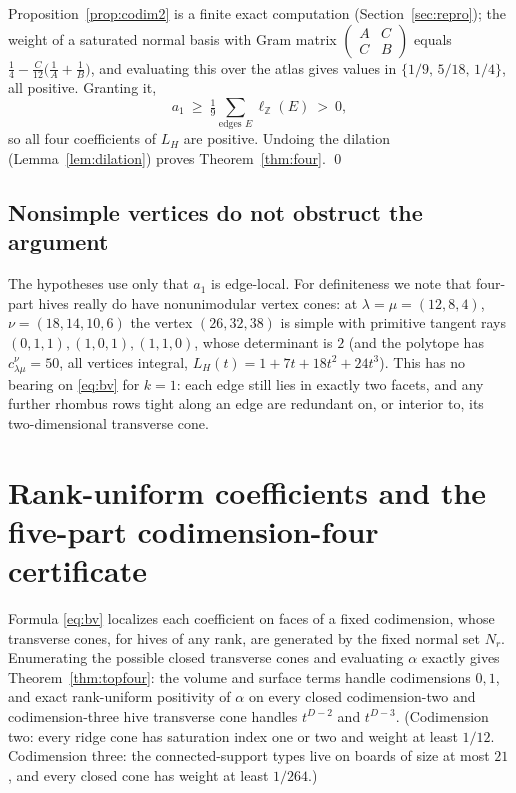 \documentclass[11pt]{amsart}
\theoremstyle{definition}
\newcommand{\Z}{\mathbb{Z}}
\newcommand{\lam}{\lambda}
\begin{document}
Proposition~\ref{prop:codim2} is a finite exact computation
(Section~\ref{sec:repro}); the weight of a saturated normal basis with Gram
matrix $\left(\begin{smallmatrix}A&C\\ C&B\end{smallmatrix}\right)$ equals
$\tfrac14-\tfrac{C}{12}\bigl(\tfrac1A+\tfrac1B\bigr)$, and evaluating this over
the atlas gives values in $\{1/9,\,5/18,\,1/4\}$, all positive. Granting it,
\[
  a_1\ \ge\ \tfrac19\sum_{\text{edges }E}\ell_{\Z}(E)\ >\ 0,
\]
so all four coefficients of $L_H$ are positive. Undoing the dilation
(Lemma~\ref{lem:dilation}) proves Theorem~\ref{thm:four}. \qed

\subsection{Nonsimple vertices do not obstruct the argument}\label{sec:nonsimple}
The hypotheses use only that $a_1$ is edge-local. For definiteness we note that
four-part hives really do have nonunimodular vertex cones: at
$\lam=\mu=(12,8,4)$, $\nu=(18,14,10,6)$ the vertex $(26,32,38)$ is simple with
primitive tangent rays $(0,1,1),(1,0,1),(1,1,0)$, whose determinant is $2$
(and the polytope has $c^{\nu}_{\lam\mu}=50$, all vertices integral,
$L_H(t)=1+7t+18t^2+24t^3$). This has no bearing on \eqref{eq:bv} for $k=1$: each
edge still lies in exactly two facets, and any further rhombus rows tight along
an edge are redundant on, or interior to, its two-dimensional transverse cone.

\section{Rank-uniform coefficients and the five-part codimension-four
certificate}\label{sec:uniform}

Formula \eqref{eq:bv} localizes each coefficient on faces of a fixed codimension,
whose transverse cones, for hives of any rank, are generated by the fixed normal
set $N_r$. Enumerating the possible closed transverse cones and evaluating
$\alpha$ exactly gives Theorem~\ref{thm:topfour}: the volume and surface terms
handle codimensions $0,1$, and exact rank-uniform positivity of $\alpha$ on every
closed codimension-two and codimension-three hive transverse cone handles $t^{D-2}$
and $t^{D-3}$. (Codimension two: every ridge cone has saturation index one or
two and weight at least $1/12$. Codimension three: the connected-support types
live on boards of size at most $21$, and every closed cone has weight at least
$1/264$.)
\end{document}
